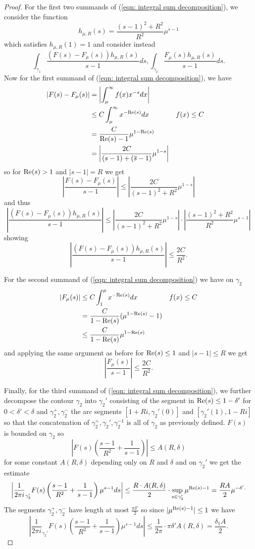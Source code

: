 \begin{proof}
    For the first two summands of (\ref{eqn: integral sum decomposition}), we consider the function 
    $$h_{\mu, R}(s)=\frac{(s-1)^{2}+R^{2}}{R^{2}}\mu^{s-1}$$
    which satisfies $h_{\mu,R}(1)=1$ and consider instead 
    $$\int_{\gamma_{1}}\frac{(F(s)-F_{\mu}(s))h_{\mu,R}(s)}{s-1}ds, \int_{\gamma_{2}}\frac{F_{\mu}(s)h_{\mu,R}(s)}{s-1}ds.$$
    Now for the first summand of (\ref{eqn: integral sum decomposition}), we have 
    \begin{align*}
        |F(s)-F_{\mu}(s)| &= \left|\int_{\mu}^{\infty}f(x)x^{-s}dx\right| \\
        &\leq C\int_{\mu}^{\infty}x^{-\mathrm{Re}(s)}dx && f(x)\leq C \\
        &= \frac{C}{\mathrm{Re}(s)-1}\mu^{1-\mathrm{Re}(s)} \\
        &= \left|\frac{2C}{(s-1)+(\overline{s}-1)}\mu^{1-s}\right|
    \end{align*}
    so for $\mathrm{Re}(s)>1$ and $|s-1|=R$ we get 
    $$\left|\frac{F(s)-F_{\mu}(s)}{s-1}\right|\leq \left|\frac{2C}{(s-1)^{2}+R^{2}}\mu^{1-s}\right|$$
    and thus 
    $$\left|\frac{(F(s)-F_{\mu}(s))h_{\mu,R}(s)}{s-1}\right|\leq \left|\frac{2C}{(s-1)^{2}+R^{2}}\mu^{1-s}\right|\cdot\left|\frac{(s-1)^{2}+R^{2}}{R^{2}}\mu^{s-1}\right|$$
    showing 
    $$\left|\frac{(F(s)-F_{\mu}(s))h_{\mu,R}(s)}{s-1}\right|\leq\frac{2C}{R^{2}}.$$

    For the second summand of (\ref{eqn: integral sum decomposition}) we have on $\gamma_{2}$
    \begin{align*}
        |F_{\mu}(s)| &\leq C\int_{1}^{\mu}x^{-\mathrm{Re}(s)}dx && f(x)\leq C \\
        &= \frac{C}{1-\mathrm{Re}(s)}(\mu^{1-\mathrm{Re}(s)}-1) \\
        &\leq \frac{C}{1-\mathrm{Re}(s)}\mu^{1-\mathrm{Re}(s)}
    \end{align*}
    and applying the same argument as before for $\mathrm{Re}(s)\leq 1$ and $|s-1|\leq R$ we get 
    $$\left|\frac{F_{\mu}(s)}{s-1}\right|\leq\frac{2C}{R^{2}}.$$

    Finally, for the third summand of (\ref{eqn: integral sum decomposition}), we further decompose the contour $\gamma_{2}$ into $\gamma_{2}'$ consisting of the segment in $\mathrm{Re}(s)\leq 1-\delta'$ for $0<\delta'<\delta$ and $\gamma_{2}^{+},\gamma_{2}^{-}$ the arc segments $[1+Ri, \gamma_{2}'(0)]$ and $[\gamma_{2}'(1),1-Ri]$ so that the concatenation of $\gamma_{2}^{+},\gamma_{2}',\gamma_{2}^{-1}$ is all of $\gamma_{2}$ as previously defined. $F(s)$ is bounded on $\gamma_{2}$ so 
    $$\left|F(s)\left(\frac{s-1}{R^{2}}+\frac{1}{s-1}\right)\right|\leq A(R,\delta)$$
    for some constant $A(R,\delta)$ depending only on $R$ and $\delta$ and on $\gamma_{2}'$ we get the estimate
    $$\left|\frac{1}{2\pi i}_{\gamma_{2}'}F(s)\left(\frac{s-1}{R^{2}}+\frac{1}{s-1}\right)\mu^{s-1}ds\right|\leq\frac{R\cdot A(R,\delta)}{2}\cdot\sup_{s\in\gamma_{2}'}\mu^{\mathrm{Re}(s)-1}=\frac{RA}{2}\mu^{-\delta'.}$$
    The segments $\gamma_{2}^{+},\gamma_{2}^{-}$ have length at most $\frac{\pi\delta'}{2}$ so since $|\mu^{\mathrm{Re}(s)-1}|\leq 1$ we have 
    $$\left|\frac{1}{2\pi i}_{\gamma_{2}'}F(s)\left(\frac{s-1}{R^{2}}+\frac{1}{s-1}\right)\mu^{s-1}ds\right|\leq\frac{1}{2\pi}\cdot \pi\delta'A(R,\delta)=\frac{\delta_{1}A}{2}.$$


\end{proof}
